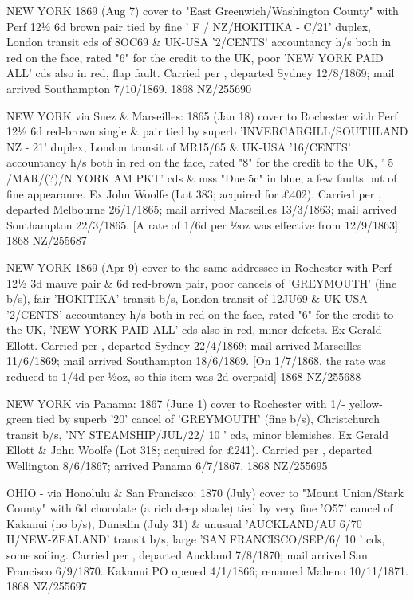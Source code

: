\documentclass[justified]{tufte-book}
\begin{document}
%
{NEW YORK 1869 (Aug 7) cover to "East Greenwich/Washington County" with Perf 12½ 6d brown pair tied by fine ' F / NZ/HOKITIKA - C/21' duplex, London transit cds of 8OC69 \& UK-USA '2/CENTS' accountancy h/s both in red on the face, rated "6" for the credit to the UK, poor 'NEW YORK PAID ALL' cds also in red, flap fault. Carried per , departed Sydney 12/8/1869; mail arrived Southampton 7/10/1869.}%
{1868}%
{NZ/255690}%
{}%
{}
{}%
{}

%
{NEW YORK via Suez \& Marseilles: 1865 (Jan 18) cover to Rochester with Perf 12½ 6d red-brown single \& pair tied by superb 'INVERCARGILL/SOUTHLAND NZ - 21' duplex, London transit of MR15/65 \& UK-USA '16/CENTS' accountancy h/s both in red on the face, rated "8" for the credit to the UK, ' 5 /MAR/(?)/N YORK AM PKT' cds \& mss "Due 5c" in blue, a few faults but of fine appearance. Ex John Woolfe (Lot 383; acquired for £402). Carried per , departed Melbourne 26/1/1865; mail arrived Marseilles 13/3/1863; mail arrived Southampton 22/3/1865. [A rate of 1/6d per ½oz was effective from 12/9/1863]}%
{1868}%
{NZ/255687}%
{}%
{}
{}%
{}

%
{NEW YORK 1869 (Apr 9) cover to the same addressee in Rochester with Perf 12½ 3d mauve pair \& 6d red-brown pair, poor cancels of 'GREYMOUTH' (fine b/s), fair 'HOKITIKA' transit b/s, London transit of 12JU69 \& UK-USA '2/CENTS' accountancy h/s both in red on the face, rated "6" for the credit to the UK, 'NEW YORK PAID ALL' cds also in red, minor defects. Ex Gerald Ellott. Carried per , departed Sydney 22/4/1869; mail arrived Marseilles 11/6/1869; mail arrived Southampton 18/6/1869. [On 1/7/1868, the rate was reduced to 1/4d per ½oz, so this item was 2d overpaid]}%
{1868}%
{NZ/255688}%
{}%
{}
{}%
{}

%
{NEW YORK via Panama: 1867 (June 1) cover to Rochester with 1/- yellow-green tied by superb '20' cancel of 'GREYMOUTH' (fine b/s), Christchurch transit b/s, 'NY STEAMSHIP/JUL/22/ 10 ' cds, minor blemishes. Ex Gerald Ellott \& John Woolfe (Lot 318; acquired for £241). Carried per , departed Wellington 8/6/1867; arrived Panama 6/7/1867.}%
{1868}%
{NZ/255695}%
{}%
{}
{}%
{}






%
{OHIO - via Honolulu \& San Francisco: 1870 (July) cover to "Mount Union/Stark County" with 6d chocolate (a rich deep shade) tied by very fine 'O57' cancel of Kakanui (no b/s), Dunedin (July 31) \& unusual 'AUCKLAND/AU 6/70 H/NEW-ZEALAND' transit b/s, large 'SAN FRANCISCO/SEP/6/ 10 ' cds, some soiling. Carried per , departed Auckland 7/8/1870; mail arrived San Francisco 6/9/1870. Kakanui PO opened 4/1/1866; renamed Maheno 10/11/1871.}%
{1868}%
{NZ/255697}%
{}%
{}
{}%
{}
\end{document}
